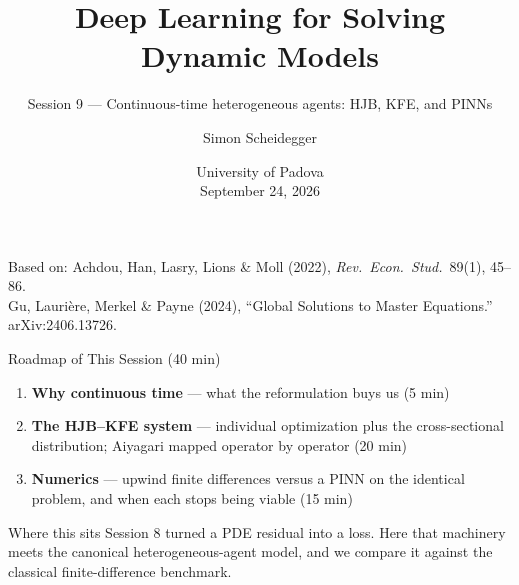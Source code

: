 \documentclass[aspectratio=169,11pt]{beamer}
\title[Continuous time -- Padova 2026]%
{Deep Learning for Solving Dynamic Models}
\subtitle{Session 9 --- Continuous-time heterogeneous agents: HJB, KFE, and PINNs}
\author{Simon Scheidegger}
\institute[HEC Lausanne]{HEC, University of Lausanne}
\date{University of Padova\\September 24, 2026}
\begin{document}
{
\begin{frame}
\titlepage
\vspace{-0.4cm}
\begin{center}
{\footnotesize Based on: Achdou, Han, Lasry, Lions \& Moll (2022), \emph{Rev.\ Econ.\ Stud.}\ 89(1), 45--86.}\\[2pt]
{\footnotesize Gu, Lauri\`ere, Merkel \& Payne (2024), ``Global Solutions to Master Equations.'' arXiv:2406.13726.}
\end{center}
\end{frame}
}

\begin{frame}{Roadmap of This Session (40 min)}
\begin{enumerate}\itemsep6pt
  \item \textbf{Why continuous time} --- what the reformulation buys us (5 min)
  \item \textbf{The HJB--KFE system} --- individual optimization plus the cross-sectional
        distribution; Aiyagari mapped operator by operator (20 min)
  \item \textbf{Numerics} --- upwind finite differences versus a PINN on the identical
        problem, and when each stops being viable (15 min)
\end{enumerate}
\vspace{6pt}
\begin{block}{Where this sits}
Session 8 turned a PDE residual into a loss. Here that machinery meets the
canonical heterogeneous-agent model, and we compare it against the classical
finite-difference benchmark.
\end{block}
\end{frame}
\end{document}
